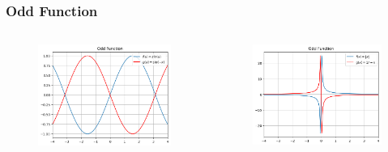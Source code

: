 \documentclass{beamer}
\begin{document}
\begin{frame}
  \frametitle{Odd Function}
  \begin{columns}[T]
    \begin{column}{0.5\textwidth}
    \begin{figure}[t]
    \includegraphics[width=\linewidth]{odd.png}
    \end{figure}
  \end{column}

  \begin{column}{0.5\textwidth}
    \begin{figure}[t]
    \includegraphics[width=\linewidth]{odd2.png}
    \end{figure}
  \end{column}
\end{columns}
\end{frame}
\end{document}
